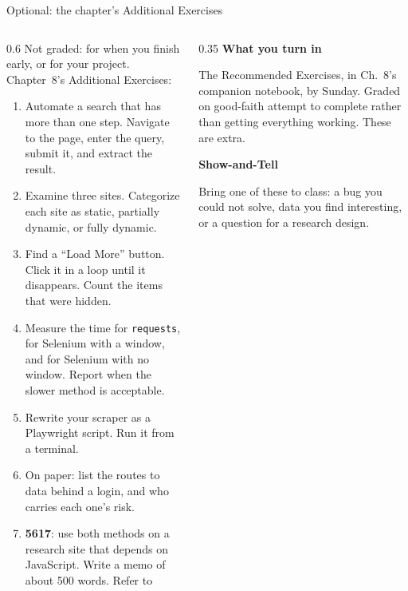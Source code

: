 \documentclass[9pt,aspectratio=169]{beamer}
\begin{document}
\begin{frame}{Optional: the chapter's Additional Exercises}
    \begin{columns}[T]
        \begin{column}{0.6\textwidth}
            Not graded: for when you finish early, or for your project. Chapter~8's Additional Exercises:
            \begin{enumerate}\small
                \item Automate a search that has more than one step. Navigate to the page, enter the query, submit it, and extract the result.
                \item Examine three sites. Categorize each site as static, partially dynamic, or fully dynamic.
                \item Find a ``Load More'' button. Click it in a loop until it disappears. Count the items that were hidden.
                \item Measure the time for \texttt{requests}, for Selenium with a window, and for Selenium with no window. Report when the slower method is acceptable.
                \item Rewrite your scraper as a Playwright script. Run it from a terminal.
                \item On paper: list the routes to data behind a login, and who carries each one's risk.
                \item[7.] \textbf{5617}: use both methods on a research site that depends on JavaScript. Write a memo of about 500 words. Refer to \textcite{mitchell2018web}
            \end{enumerate}
        \end{column}
        \begin{column}{0.35\textwidth}
            \textbf{What you turn in}\\[2pt]
            {\footnotesize The Recommended Exercises, in Ch.~8's companion notebook, by Sunday. Graded on good-faith attempt to complete rather than getting everything working. These are extra.\par}
            \medskip
            \textbf{Show-and-Tell}\\[2pt]
            {\footnotesize Bring one of these to class: a bug you could not solve, data you find interesting, or a question for a research design.\par}
        \end{column}
    \end{columns}
\end{frame}
\end{document}
